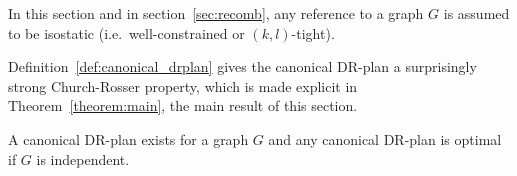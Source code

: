 In this section and in section~\ref{sec:recomb}, any reference to a graph $G$ is assumed to be isostatic (i.e.\ well-constrained or $(k,l)$-tight).




Definition~\ref{def:canonical_drplan} gives the canonical DR-plan a surprisingly strong Church-Rosser property, which is made explicit in Theorem~\ref{theorem:main}, the main result of this section.

\begin{theorem}
\label{theorem:canonical_exists_and_is_optimal}
\label{theorem:canonical_is_optimal}
\label{theorem:main}
    A canonical DR-plan exists for a graph $G$ and any canonical DR-plan is optimal if $G$ is independent.
\end{theorem}






